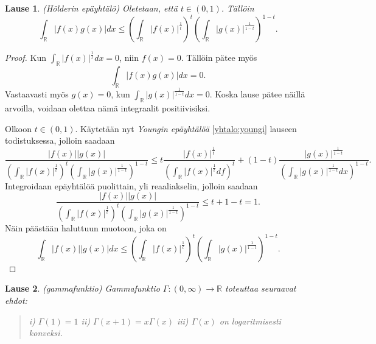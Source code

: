 \documentclass[12pt]{article}
\theoremstyle{definition}
\theoremstyle{plain}
\newtheorem{lause}{Lause}
\numberwithin{equation}{section}
\begin{document}
\begin{lause} \label{lause: hölder}
(Hölderin epäyhtälö) Oletetaan, että $t \in (0,1)$. Tällöin 
\begin{equation}
    \int_{\mathbb{R}} |f(x)g(x)|dx \le \left( \int_{\mathbb{R}} |f(x)|^{\frac{1}{t}} \right)^{t}\left( \int_{\mathbb{R}} |g(x)|^{\frac{1}{1-t}}\right)^{1-t}.
\end{equation}
\end{lause}
\begin{proof}
Kun $\int_\mathbb{R}|f(x)|^{\frac{1}{t}}dx=0$,  niin $f(x)=0$. Tällöin pätee myös
\begin{equation}
    \int_{\mathbb{R}} |f(x)g(x)|dx=0.
\end{equation}
Vastaavasti myös $g(x)=0$, kun $\int_{\mathbb{R}}|g(x)|^{\frac{1}{1-t}}dx=0$. Koska lause pätee näillä arvoilla, voidaan olettaa nämä integraalit positiivisiksi.

Olkoon $t\in(0,1).$ Käytetään nyt \emph{Youngin epäyhtälöä} \eqref{yhtalo:youngi} lauseen todistuksessa, jolloin saadaan
\begin{equation*}
    \frac{|f(x)||g(x)|}{\left(\int_{\mathbb{R}}|f(x)|^{\frac{1}{t}}\right)^{t}\left(\int_{\mathbb{R}}|g(x)|^{\frac{1}{1-t}}\right)^{1-t}} \le t\frac{|f(x)|^{\frac{1}{t}}}{\left(\int_{\mathbb{R}}|f(x)|^{\frac{1}{t}}df\right)^{t}}+(1-t)\frac{|g(x)|^{\frac{1}{1-t}}}{\left(\int_{\mathbb{R}}|g(x)|^{\frac{1}{1-t}}dx\right)^{1-t}}.
\end{equation*}
Integroidaan epäyhtälöä puolittain, yli reaaliakselin, jolloin saadaan
\begin{equation*}
     \frac{|f(x)||g(x)|}{\left(\int_{\mathbb{R}}|f(x)|^{\frac{1}{t}}\right)^{t}\left(\int_{\mathbb{R}}|g(x)|^{\frac{1}{1-t}}\right)^{1-t}}\le t+1-t=1.
\end{equation*}
Näin päästään haluttuun muotoon, joka on
\begin{equation*}
    \int_{\mathbb{R}} |f(x)||g(x)|dx \le \left( \int_{\mathbb{R}} |f(x)|^{\frac{1}{t}} \right)^{t}\left( \int_{\mathbb{R}} |g(x)|^{\frac{1}{1-t}}\right)^{1-t}.
\end{equation*}

\end{proof}

\begin{lause}
(gammafunktio) Gammafunktio $\Gamma : (0, \infty) \rightarrow \mathbb{R}$  toteuttaa seuraavat ehdot:
\begin{quote}
    i) $\Gamma(1)=1$ \newline
    ii) $\Gamma(x+1)=x\Gamma(x)$ \newline
    iii) $\Gamma(x)$ on logaritmisesti konveksi.
\end{quote}
\end{lause}
\end{document}

